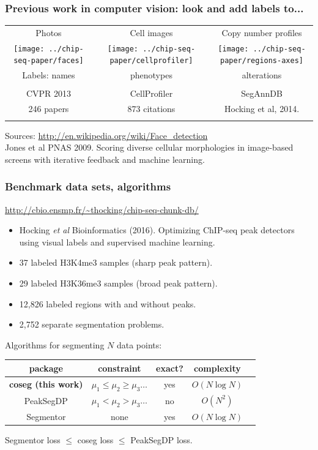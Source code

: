 \documentclass{beamer}
\begin{document}
\begin{frame}
  \frametitle{Previous work in computer vision: look and add labels
    to...}
  \begin{tabular}{ccc}
    Photos & Cell images & Copy number profiles \\
    \texttt{[image: ../chip-seq-paper/faces]} &
    \texttt{[image: ../chip-seq-paper/cellprofiler]} &
    \texttt{[image: ../chip-seq-paper/regions-axes]}\\
    Labels: names & phenotypes & alterations \\ \\
    CVPR 2013 & CellProfiler & SegAnnDB \\
    246 papers & 873 citations & Hocking et al, 2014. \\
     &
  \end{tabular}
  Sources: \url{http://en.wikipedia.org/wiki/Face_detection}\\
  Jones et al PNAS 2009. Scoring diverse cellular morphologies in
  image-based screens with iterative feedback and machine learning.
\end{frame}

\begin{frame}
  \frametitle{Benchmark data sets, algorithms}

 \url{http://cbio.ensmp.fr/~thocking/chip-seq-chunk-db/}
  \begin{itemize}
  \item Hocking \emph{et al} Bioinformatics (2016). Optimizing
    ChIP-seq peak detectors using visual labels and supervised machine
    learning.
  \item 37 labeled H3K4me3 samples (sharp peak pattern).
  \item 29 labeled H3K36me3 samples (broad peak pattern).
  \item 12,826 labeled regions with and without peaks.
  \item 2,752 separate segmentation problems.
  \end{itemize}

  Algorithms for segmenting $N$ data points:
  \begin{center}
  \begin{tabular}{ccccc}
    package & constraint & exact? & complexity \\
    \hline
    \textbf{coseg (this work)} & $\mu_1 \leq \mu_2 \geq \mu_3 \dots$ & yes & $O(N\log N)$ \\
    PeakSegDP & $\mu_1 < \mu_2 > \mu_3 \dots$ & no & $O(N^2)$\\
    Segmentor & none & yes & $O(N\log N)$
  \end{tabular}

  \vskip 0.5cm

  Segmentor loss $\leq$ coseg loss $\leq$ PeakSegDP loss.
  \end{center}
\end{frame}
\end{document}
